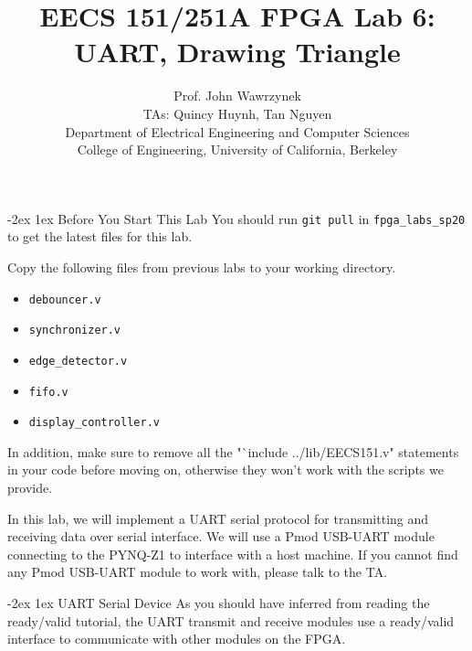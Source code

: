 \documentclass[11pt]{article}
\makeatletter
\renewcommand{\section}
{\@startsection {section}{1}{0pt}
 {-2ex}
 {1ex}
 {\bfseries\Large}}
\makeatother
\begin{document}
\def\PYZsq{\textquotesingle}
\title{\vspace{-0.4in}\Large \bf EECS 151/251A FPGA Lab 6:\\UART, Drawing Triangle\vspace{-0.1in}}

\author{Prof. John Wawrzynek \\
TAs: Quincy Huynh, Tan Nguyen \\ Department of Electrical Engineering and Computer Sciences\\
College of Engineering, University of California, Berkeley}
\date{}
\maketitle

\section{Before You Start This Lab}
You should run \verb|git pull| in \verb|fpga_labs_sp20| to get the latest files for this lab.

Copy the following files from previous labs to your working directory.
\begin{itemize}
  \item \verb|debouncer.v|
  \item \verb|synchronizer.v|
  \item \verb|edge_detector.v|
  \item \verb|fifo.v|
  \item \verb|display_controller.v|
\end{itemize}

In addition, make sure to remove all the "`include ../lib/EECS151.v" statements in your code before moving on, otherwise they won't work with the scripts we provide.

In this lab, we will implement a UART serial protocol for transmitting and receiving data over serial interface. We will use a Pmod USB-UART module connecting to the PYNQ-Z1 to interface with a host machine. If you cannot find any Pmod USB-UART module to work with, please talk to the TA.

\section{UART Serial Device}
As you should have inferred from reading the ready/valid tutorial, the UART transmit and receive modules use a ready/valid interface to communicate with other modules on the FPGA.
\end{document}
